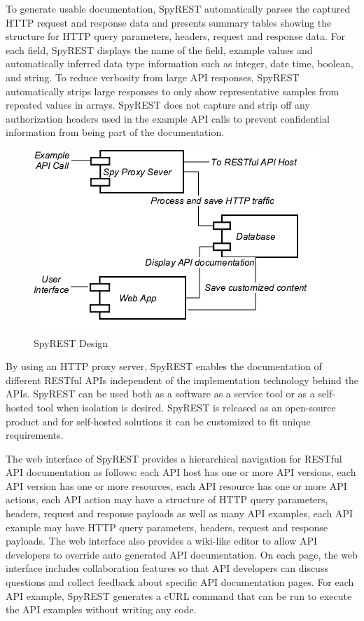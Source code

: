 \documentclass[conference]{IEEEtran}
\begin{document}
To generate usable documentation, SpyREST automatically parses the captured HTTP request and response data and presents summary tables showing the structure for HTTP query parameters, headers, request and response data. For each field, SpyREST displays the name of the field, example values and automatically inferred data type information such as integer, date time, boolean, and string. To reduce verbosity from large API responses, SpyREST automatically strips large responses to only show representative samples from repeated values in arrays. SpyREST does not capture and strip off any authorization headers used in the example API calls to prevent confidential information from being part of the documentation.

\begin{figure}[tbh]
  \centering
  \includegraphics[width=\linewidth]{spyrest_components.png}
  \caption{SpyREST Design}
  \label{fig:components}
\end{figure}

By using an HTTP proxy server, SpyREST enables the documentation of different RESTful APIs independent of the implementation technology behind the APIs. SpyREST can be used both as a software as a service tool or as a self-hosted tool when isolation is desired. SpyREST is released as an open-source product and for self-hosted solutions it can be customized to fit unique requirements.


The web interface of SpyREST provides a hierarchical navigation for RESTful API documentation as follows: each API host has one or more API versions, each API version has one or more resources, each API resource has one or more API actions, each API action may have a structure of HTTP query parameters, headers, request and response payloads as well as many API examples, each API example may have HTTP query parameters, headers, request and response payloads. The web interface also provides a wiki-like editor to allow API developers to override auto generated API documentation. On each page, the web interface includes collaboration features so that API developers can discuss questions and collect feedback about specific API documentation pages. For each API example, SpyREST generates a cURL command that can be run to execute the API examples without writing any code.
\end{document}
